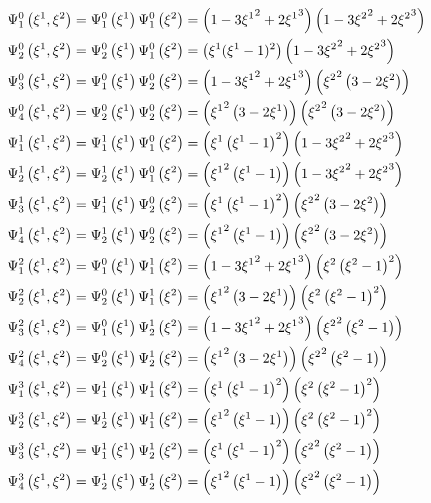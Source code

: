 \begin{equation}
  \begin{split}
    \chbfn{1}{0}{\xione,\xitwo}&=\chbfn{1}{0}{\xione}\chbfn{1}{0}{\xitwo}=\pbrac{1-3\xionesq+2\xionecube}\pbrac{1-3\xitwosq+2\xitwocube}\\
    \chbfn{2}{0}{\xione,\xitwo}&=\chbfn{2}{0}{\xione}\chbfn{1}{0}{\xitwo}=\pbrac{\xione(\xione-1)^{2}}\pbrac{1-3\xitwosq+2\xitwocube}\\
    \chbfn{3}{0}{\xione,\xitwo}&=\chbfn{1}{0}{\xione}\chbfn{2}{0}{\xitwo}=\pbrac{1-3\xionesq+2\xionecube}\pbrac{\xitwosq\pbrac{3-2\xitwo}}\\
    \chbfn{4}{0}{\xione,\xitwo}&=\chbfn{2}{0}{\xione}\chbfn{2}{0}{\xitwo}=\pbrac{\xionesq\pbrac{3-2\xione}}\pbrac{\xitwosq\pbrac{3-2\xitwo}}\\
    \chbfn{1}{1}{\xione,\xitwo}&=\chbfn{1}{1}{\xione}\chbfn{1}{0}{\xitwo}=\pbrac{\xione\pbrac{\xione-1}^{2}}\pbrac{1-3\xitwosq+2\xitwocube}\\
    \chbfn{2}{1}{\xione,\xitwo}&=\chbfn{2}{1}{\xione}\chbfn{1}{0}{\xitwo}=\pbrac{\xionesq\pbrac{\xione-1}}\pbrac{1-3\xitwosq+2\xitwocube}\\
    \chbfn{3}{1}{\xione,\xitwo}&=\chbfn{1}{1}{\xione}\chbfn{2}{0}{\xitwo}=\pbrac{\xione\pbrac{\xione-1}^{2}}\pbrac{\xitwosq\pbrac{3-2\xitwo}}\\
    \chbfn{4}{1}{\xione,\xitwo}&=\chbfn{2}{1}{\xione}\chbfn{2}{0}{\xitwo}=\pbrac{\xionesq\pbrac{\xione-1}}\pbrac{\xitwosq\pbrac{3-2\xitwo}}\\
    \chbfn{1}{2}{\xione,\xitwo}&=\chbfn{1}{0}{\xione}\chbfn{1}{1}{\xitwo}=\pbrac{1-3\xionesq+2\xionecube}\pbrac{\xitwo\pbrac{\xitwo-1}^{2}}\\
    \chbfn{2}{2}{\xione,\xitwo}&=\chbfn{2}{0}{\xione}\chbfn{1}{1}{\xitwo}=\pbrac{\xionesq\pbrac{3-2\xione}}\pbrac{\xitwo\pbrac{\xitwo-1}^{2}}\\
    \chbfn{3}{2}{\xione,\xitwo}&=\chbfn{1}{0}{\xione}\chbfn{2}{1}{\xitwo}=\pbrac{1-3\xionesq+2\xionecube}\pbrac{\xitwosq\pbrac{\xitwo-1}}\\
    \chbfn{4}{2}{\xione,\xitwo}&=\chbfn{2}{0}{\xione}\chbfn{2}{1}{\xitwo}=\pbrac{\xionesq\pbrac{3-2\xione}}\pbrac{\xitwosq\pbrac{\xitwo-1}}\\
    \chbfn{1}{3}{\xione,\xitwo}&=\chbfn{1}{1}{\xione}\chbfn{1}{1}{\xitwo}=\pbrac{\xione\pbrac{\xione-1}^{2}}\pbrac{\xitwo\pbrac{\xitwo-1}^{2}}\\
    \chbfn{2}{3}{\xione,\xitwo}&=\chbfn{2}{1}{\xione}\chbfn{1}{1}{\xitwo}=\pbrac{\xionesq\pbrac{\xione-1}}\pbrac{\xitwo\pbrac{\xitwo-1}^{2}}\\
    \chbfn{3}{3}{\xione,\xitwo}&=\chbfn{1}{1}{\xione}\chbfn{2}{1}{\xitwo}=\pbrac{\xione\pbrac{\xione-1}^{2}}\pbrac{\xitwosq\pbrac{\xitwo-1}}\\
    \chbfn{4}{3}{\xione,\xitwo}&=\chbfn{2}{1}{\xione}\chbfn{2}{1}{\xitwo}=\pbrac{\xionesq\pbrac{\xione-1}}\pbrac{\xitwosq\pbrac{\xitwo-1}}    
  \end{split}
  \label{eqn:BicubicHermBFuns}
\end{equation}


